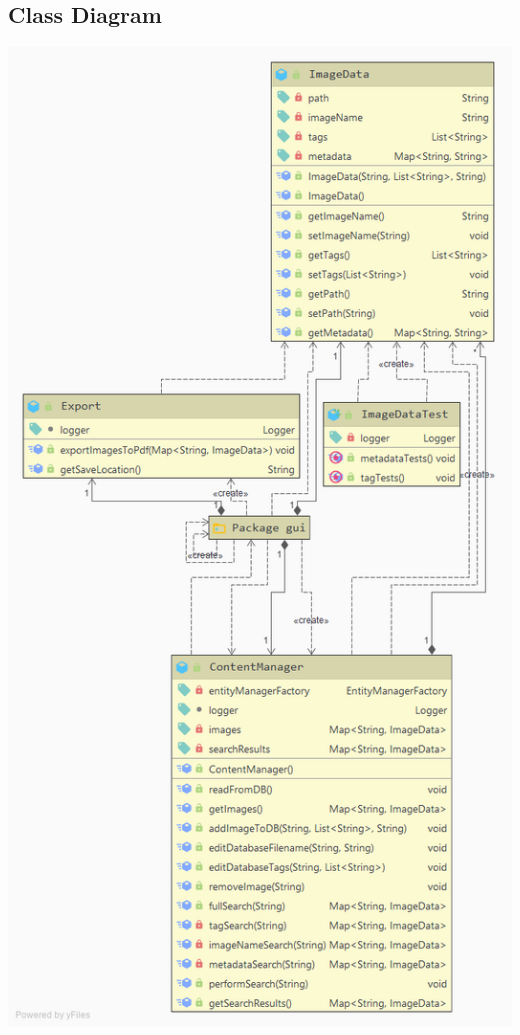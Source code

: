 \documentclass{article}
\begin{document}
\subsection{Class Diagram}
\begin{center}
    \includegraphics[scale=0.45]{./Images/class_diagram.png}
\end{center}







\end{document}
